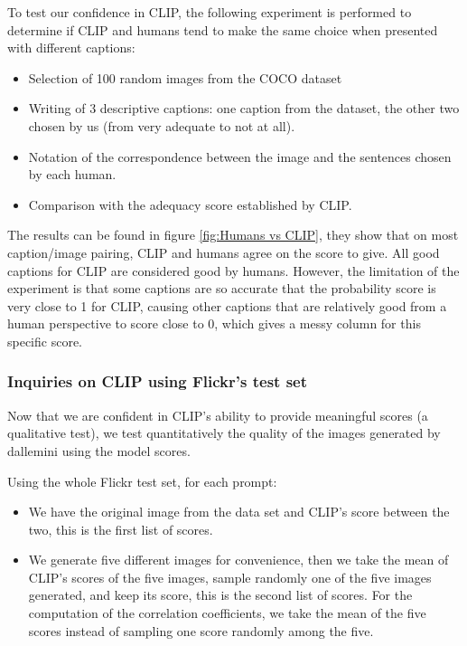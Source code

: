 \documentclass{article}
\begin{document}
\begin{multicols}{2}


To test our confidence in CLIP, the following experiment is performed to determine if CLIP and humans tend to make the same choice when presented with different captions: 
\begin{itemize}
  \item Selection of 100 random images from the COCO dataset
  \item Writing of 3 descriptive captions: one caption from the dataset, the other two chosen by us (from very adequate to not at all).
  \item Notation of the correspondence between the image and the sentences chosen by each human.
  \item Comparison with the adequacy score established by CLIP.
\end{itemize}

The results can be found in figure \ref{fig:Humans vs CLIP}, they show that on most caption/image pairing, CLIP and humans agree on the score to give. All good captions for CLIP are considered good by humans. However, the limitation of the experiment is that some captions are so accurate that the probability score is very close to 1 for CLIP, causing other captions that are relatively good from a human perspective to score close to 0, which gives a messy column for this specific score.

\subsubsection{Inquiries on CLIP using Flickr's test set}

Now that we are confident in CLIP's ability to provide meaningful scores (a qualitative test), we test quantitatively the quality of the images generated by \gls{dallemini} using the model scores. 

Using the whole Flickr test set, for each prompt: 
\begin{itemize}
    \item We have the original image from the data set and CLIP's score between the two, this is the first list of scores.
    \item We generate five different images for convenience, then we take the mean of CLIP's scores of the five images, sample randomly one of the five images generated, and keep its score, this is the second list of scores. For the computation of the correlation coefficients, we take the mean of the five scores instead of sampling one score randomly among the five. 
\end{itemize}


\end{multicols}
\end{document}
